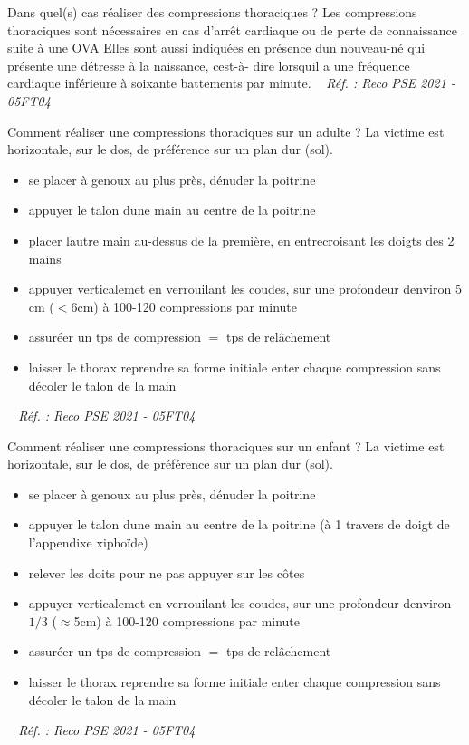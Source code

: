 \documentclass[grid,avery5371,landscape]{flashcards}
\makeatletter
\newcounter{nocarte}
\newcommand{\categ}[1]{%
  \def\@categ{#1}%
  \setcounter{nocarte}{0}%
}
\newcommand{\source}[1]{%
  \medskip
  \itshape%
   ~ \hfill Réf. : #1}
\makeatother
\begin{document}
\color[HTML]{003273}
\categ{PSE}
\begin{flashcard}[CAT]{
 Dans quel(s) cas réaliser des compressions thoraciques ?   }
  Les compressions thoraciques sont nécessaires en cas d'arrêt cardiaque ou de perte de connaissance suite à une OVA
Elles sont aussi indiquées en présence dun nouveau-né qui présente une détresse à la naissance, cest-à- dire lorsquil a une fréquence cardiaque inférieure à soixante battements par minute.
  \source{Reco PSE 2021 - 05FT04}
\end{flashcard}


\color[HTML]{003273}
\categ{PSE}
\begin{flashcard}[geste]{
 Comment réaliser une compressions thoraciques sur un adulte ?   }
  La victime est horizontale, sur le dos, de préférence sur un plan dur (sol). \\
\begin{itemize}
\item se placer à genoux au plus près, dénuder la poitrine 
\item appuyer le talon dune main au centre de la poitrine
\item placer lautre main au-dessus de la première, en entrecroisant les doigts des 2 mains
\item appuyer verticalemet en verrouilant les coudes, sur une profondeur denviron 5 cm ($<$6cm) à 100-120 compressions par minute 
\item assuréer un tps de compression $=$ tps de relâchement
\item laisser le thorax reprendre sa forme initiale enter chaque compression sans décoler le talon de la main
\end{itemize}
  \source{Reco PSE 2021 - 05FT04}
\end{flashcard}


\color[HTML]{003273}
\categ{PSE}
\begin{flashcard}[geste]{
 Comment réaliser une compressions thoraciques sur un enfant ?   }
  La victime est horizontale, sur le dos, de préférence sur un plan dur (sol). \\
\begin{itemize}
\item se placer à genoux au plus près, dénuder la poitrine 
\item appuyer le talon dune main au centre de la poitrine (à 1 travers de doigt de l'appendixe xiphoïde) 
\item relever les doits pour ne pas appuyer sur les côtes
\item appuyer verticalemet en verrouilant les coudes, sur une profondeur denviron $1/3$ ($\approx$5cm) à 100-120 compressions par minute 
\item assuréer un tps de compression $=$ tps de relâchement
\item laisser le thorax reprendre sa forme initiale enter chaque compression sans décoler le talon de la main
\end{itemize} 
  \source{Reco PSE 2021 - 05FT04}
\end{flashcard}
\end{document}
